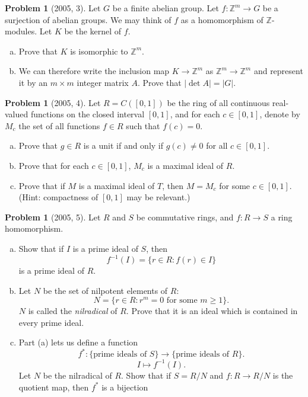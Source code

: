 \documentclass{article}
\newcommand{\inv}{^{-1}}
\newcommand{\<}{\langle} %
\renewcommand{\>}{\rangle} %
\theoremstyle{plain}
\theoremstyle{remark}
\theoremstyle{definition}
\newtheorem{examproblem}[equation]{Problem}
\begin{document}
\begin{examproblem}[2005, 3]
	Let $G$ be a finite abelian group. Let $f:\mathbb Z^m\rightarrow G$ be a
	surjection of abelian groups. We may think of $f$ as a homomorphism
	of $\mathbb Z$-modules. Let $K$ be the kernel of $f$.
	\begin{enumerate}[(a)]
		\item Prove that $K$ is isomorphic to $\mathbb Z^m$.
		\item We can therefore write the inclusion map
			$K\rightarrow\mathbb Z^m$ as $\mathbb Z^m\rightarrow\mathbb Z^m$
			and represent it by an $m\times m$ integer matrix
			$A$. Prove that $|\det A|=|G|$.
	\end{enumerate}
\end{examproblem}

\begin{examproblem}[2005, 4]
	Let $R=C([0,1])$ be the ring of all continuous real-valued functions
	on the closed interval $[0,1]$, and for each $c\in[0,1]$, denote by
	$M_c$ the set of all functions $f\in R$ such that $f(c)=0$.
	\begin{enumerate}[(a)]
		\item Prove that $g\in R$ is a unit if and only if $g(c)\neq0$
			for all $c\in[0,1]$.
		\item Prove that for each $c\in[0,1]$, $M_c$ is a maximal ideal of
			$R$.
		\item Prove that if $M$ is a maximal ideal of $T$, then
			$M=M_c$ for some $c\in[0,1]$. (Hint:
			compactness of $[0,1]$ may be relevant.)
	\end{enumerate}
\end{examproblem}

\begin{examproblem}[2005, 5]
	Let $R$ and $S$ be commutative rings, and $f:R\rightarrow S$
	a ring homomorphism.
	\begin{enumerate}[(a)]
		\item Show that if $I$ is a prime ideal of $S$, then
			$$
			f\inv(I)=\{r\in R:f(r)\in I\}
			$$
			is a prime ideal of $R$.
		\item Let $N$ be the set of nilpotent elements of $R$:
			$$
			N=\{r\in R:r^m=0\text{ for some }m\geq 1\}.
			$$
			$N$ is called the \textit{nilradical} of $R$. Prove that
			it is an ideal which is contained in every prime ideal.
		\item Part (a) lets us define a function
			$$
			f^*:\{\text{prime ideals of }S\}\rightarrow
			\{\text{prime ideals of }R\}.
			$$
			$$
			I\mapsto f\inv(I).
			$$
			Let $N$ be the nilradical of $R$. Show that if
			$S=R/N$ and $f:R\rightarrow R/N$ is the quotient map,
			then $f^*$ is a bijection
	\end{enumerate}
\end{examproblem}
\end{document}
